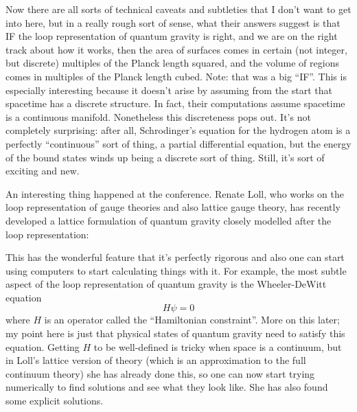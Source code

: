 \documentclass{article}
\def\tightlist{}
\renewcommand{\texttt}[1]{%
  \begingroup
  \ttfamily
  \begingroup\lccode`~=`/\lowercase{\endgroup\def~}{/\discretionary{}{}{}}%
  \begingroup\lccode`~=`[\lowercase{\endgroup\def~}{[\discretionary{}{}{}}%
  \begingroup\lccode`~=`.\lowercase{\endgroup\def~}{.\discretionary{}{}{}}%
  \catcode`/=\active\catcode`[=\active\catcode`.=\active
  \scantokens{#1\noexpand}%
  \endgroup
}
\begin{document}
Now there are all sorts of technical caveats and subtleties that I don't
want to get into here, but in a really rough sort of sense, what their
answers suggest is that IF the loop representation of quantum gravity is
right, and we are on the right track about how it works, then the area
of surfaces comes in certain (not integer, but discrete) multiples of
the Planck length squared, and the volume of regions comes in multiples
of the Planck length cubed. Note: that was a big ``IF''. This is
especially interesting because it doesn't arise by assuming from the
start that spacetime has a discrete structure. In fact, their
computations assume spacetime is a continuous manifold. Nonetheless this
discreteness pops out. It's not completely surprising: after all,
Schrodinger's equation for the hydrogen atom is a perfectly
``continuous'' sort of thing, a partial differential equation, but the
energy of the bound states winds up being a discrete sort of thing.
Still, it's sort of exciting and new.

An interesting thing happened at the conference. Renate Loll, who works
on the loop representation of gauge theories and also lattice gauge
theory, has recently developed a lattice formulation of quantum gravity
closely modelled after the loop representation:


This has the wonderful feature that it's perfectly rigorous and also one
can start using computers to start calculating things with it. For
example, the most subtle aspect of the loop representation of quantum
gravity is the Wheeler-DeWitt equation \[H\psi=0\] where \(H\) is an
operator called the ``Hamiltonian constraint''. More on this later; my
point here is just that physical states of quantum gravity need to
satisfy this equation. Getting \(H\) to be well-defined is tricky when
space is a continuum, but in Loll's lattice version of theory (which is
an approximation to the full continuum theory) she has already done
this, so one can now start trying numerically to find solutions and see
what they look like. She has also found some explicit solutions.
\end{document}
